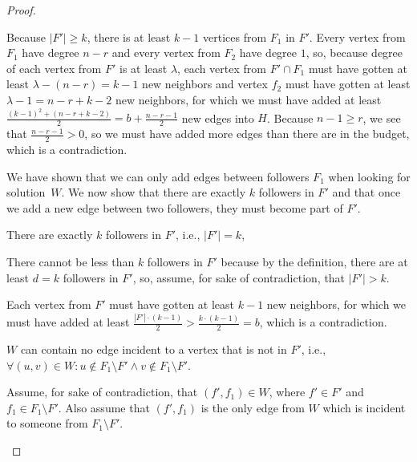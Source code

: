 \begin{proof}
\begin{subproof}
        Because $|F'| \geq k$, there is at least $k-1$ vertices from $F_1$ in $F'$.
        Every vertex from $F_1$ have degree $n-r$ and every vertex from $F_2$ have degree $1$, so,
        because degree of each vertex from $F'$ is at least $\lambda$,
        each vertex from $F' \cap F_1$ must have gotten at least $\lambda - (n - r) = k - 1$ new neighbors and
        vertex $f_2$ must have gotten at least $\lambda - 1 = n - r + k - 2$ new neighbors,
        for which we must have added at least
        $\frac{(k - 1)^2 + (n -r + k - 2)}{2} = b + \frac{n - r - 1}{2}$ new edges into $H$.
        Because $n-1 \geq r$, we see that $\frac{n - r - 1}{2} > 0$,
        so we must have added more edges than there are in the budget, which is a contradiction.
    \end{subproof}

    We have shown that we can only add edges between followers $F_1$ when looking for solution~$W$.
    We now show that there are exactly $k$ followers in $F'$ and that
    once we add a new edge between two followers, they must become part of $F'$.

    \begin{lemma}
        There are exactly $k$ followers in $F'$, i.e., $|F'| = k$,
    \end{lemma}
    \begin{subproof}
        There cannot be less than $k$ followers in $F'$ because by the definition,
        there are at least $d = k$ followers in $F'$, so, assume, for sake of contradiction, that $|F'| > k$.

        Each vertex from $F'$ must have gotten at least $k - 1$ new neighbors,
        for which we must have added at least $\frac{|F'| \cdot (k-1)}{2} > \frac{k \cdot (k-1)}{2} = b$,
        which is a contradiction.
    \end{subproof}

    \begin{lemma}\label{lemmaInProof2}
        $W$ can contain no edge incident to a vertex that is not in $F'$, i.e.,
        $\forall (u,v) \in W \colon u \notin F_1 \setminus F' \wedge v \notin F_1 \setminus F'$.
    \end{lemma}
    \begin{subproof}
        Assume, for sake of contradiction, that $(f',f_1) \in W$, where $f' \in F'$ and $f_1 \in F_1 \setminus F'$.
        Also assume that $(f',f_1)$ is the only edge from $W$ which is incident to someone from $F_1 \setminus F'$.
    

\end{subproof}
\end{proof}
